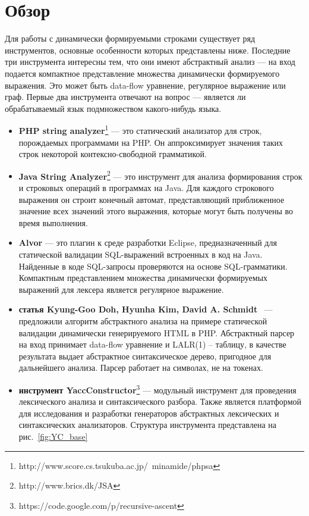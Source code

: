 \section{Обзор}
Для работы с динамически формируемыми строками существует ряд инструментов, основные особенности которых представлены ниже. 
Последние три инструмента интересны тем, что они имеют абстрактный анализ --- на вход подается компактное представление множества 
динамически формируемого выражения. Это может быть data-flow уравнение, регулярное выражение или граф. Первые два инструмента отвечают 
на вопрос --- является ли обрабатываемый язык подмножеством какого-нибудь языка. 
\begin{itemize}
\item \textbf{PHP string analyzer}\footnote{http://www.score.cs.tsukuba.ac.jp/~minamide/phpsa} --- это статический анализатор для строк, порождаемых программами на PHP. Он аппроксимирует значения 
таких строк некоторой контексно-свободной грамматикой.
\item \textbf{Java String Analyzer}\footnote{http://www.brics.dk/JSA} --- это инструмент для анализа формирования строк и строковых операций в программах на Java. 
Для каждого строкового выражения он строит конечный автомат, представляющий приближенное значение всех значений этого выражения, 
которые могут быть получены во время выполнения.
\item \textbf{Alvor} --- это плагин к среде разработки Eclipse, предназначенный для статической валидации SQL-выражений встроенных в код на Java. 
Найденные в коде  SQL-запросы проверяются на основе SQL-грамматики.  Компактным представлением множества динамически формируемых выражений для лексера 
является регулярное выражение.
\item \textbf{статья Kyung-Goo Doh, Hyunha Kim, David A. Schmidt}~\cite{Doh} --- предложили алгоритм абстрактного анализа на примере статической 
валидации  динамически генерируемого HTML в PHP. Абстрактный парсер на вход принимает data-flow уравнение и LALR(1) -- таблицу, в качестве результата 
выдает абстрактное синтаксическое дерево, пригодное для дальнейшего анализа. Парсер работает на символах, не на токенах. 
\item \textbf{инструмент YaccConstructor}\footnote{https://code.google.com/p/recursive-ascent} --- модульный инструмент для проведения лексического  
анализа и синтаксического разбора. Также является платформой для исследования и разработки генераторов абстрактных лексических и синтаксических анализаторов.
Структура инструмента представлена на рис.~\ref{fig:YC_base}


\end{itemize}
